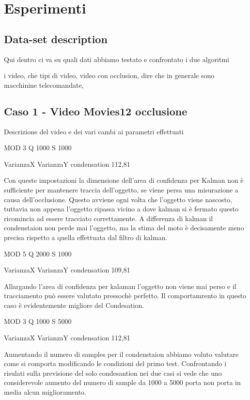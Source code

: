 
\section{Esperimenti}

\subsection{Data-set description}
Qui dentro ci va su quali dati abbiamo testato e confrontato i due algoritmi

i video, che tipi di video, video con occlusion, dire che in generale sono macchinine telecomandate, 

\subsection{Caso 1 - Video Movies12 occlusione}
Descrizione del video e dei vari cambi ai parametri effettuati 

MOD 3 Q 1000 S 1000

VarianzaX VarianzaY condensation
112,81

Con queste impostazioni la dimensione dell'area di confidenza per Kalman non è sufficiente per mantenere traccia dell'oggetto, se viene persa una misurazione a causa dell'occlusione. Questo avviene ogni volta che l'oggetto viene nascosto, tuttavia non appena l'oggetto ripassa vicino a dove kalman si è fermato questo ricomincia ad essere tracciato correttamente. A differenza di kalman il condenstaion non perde mai l'oggetto, ma la stima del moto è decisamente meno precisa rispetto a quella effettuata dal filtro di kalman.

MOD 5 Q 2000 S 1000

VarianzaX VarianzaY condensation
109,81

Allargando l'area di confidenza per kalaman l'oggetto non viene mai perso e il tracciamento può essere valutato pressochè perfetto. Il comportamrento in questo caso è evidentemente migliore del Condesation.



MOD 3 Q 1000 S 5000

VarianzaX VarianzaY condensation
112,81

Aumentando il numero di samples per il condenstaion abbiamo voluto valutare come  si comporta modificando le condizioni del primo test. Confrontando i risulati sulla previsione del solo condesantion nei due casi si vede che uno considerevole aumento del numero di sample da 1000 a 5000 porta non porta in media alcun miglioramento.


